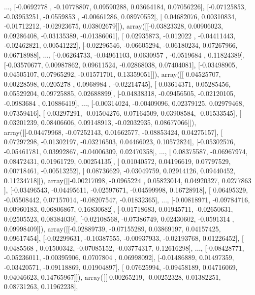 \documentclass{article}
\begin{document}
       ..., 
       [-0.0692778 , -0.10778807,  0.09590288,  0.03664184,  0.07056226],
       [-0.07125853, -0.03953251, -0.0559853 , -0.00661286,  0.08970552],
       [ 0.04682076,  0.00310834, -0.01712212, -0.02923675,  0.03802679]]), array([[-0.03823328,  0.00906023,  0.09286408, -0.03135389, -0.01386061],
       [ 0.02935873, -0.012022  , -0.04411443, -0.02462821,  0.00541222],
       [-0.02296546, -0.06605294, -0.06180234,  0.07267966,  0.06718988],
       ..., 
       [-0.06264733, -0.04961103,  0.0630957 , -0.0519684 ,  0.11824389],
       [-0.03570677,  0.00987862,  0.09611524, -0.02868038,  0.07404081],
       [-0.03498905,  0.04505107,  0.07965292, -0.01571701,  0.13359051]]), array([[ 0.04525707,  0.00228598,  0.0205278 ,  0.0968984 , -0.02214745],
       [ 0.03614371,  0.05285456,  0.05529204,  0.09725885,  0.02688899],
       [-0.04838318, -0.09456505, -0.02120105, -0.0983684 ,  0.10886419],
       ..., 
       [-0.00314024, -0.00409096,  0.02379125,  0.02979468,  0.07359416],
       [-0.03297291, -0.01504276,  0.07164509,  0.03908584, -0.01533545],
       [ 0.03201239,  0.08406606,  0.09148913, -0.02032935,  0.08677066]]), array([[-0.04479968, -0.07252143,  0.01662577, -0.08853424,  0.04275157],
       [ 0.07297298, -0.01302197, -0.03216503,  0.04466023,  0.10572824],
       [-0.05302576, -0.05461781,  0.03992867, -0.04006309,  0.02470358],
       ..., 
       [ 0.08375587, -0.06967974,  0.08472431,  0.01961729,  0.00254135],
       [ 0.01040572,  0.04196619,  0.07797529,  0.00718461, -0.00513252],
       [ 0.08736629, -0.03049759,  0.02914126,  0.09440452,  0.11234718]]), array([[-0.00217098, -0.0965224 ,  0.05823014,  0.04920327,  0.0277863 ],
       [-0.03496543, -0.04495611, -0.02597671, -0.04599998,  0.16728918],
       [ 0.06495329, -0.05508442,  0.07157014, -0.08207547, -0.01832365],
       ..., 
       [-0.00818971, -0.09784716,  0.00960183,  0.06806867,  0.16830682],
       [-0.01718683,  0.01945711, -0.02650631,  0.02505523,  0.08384039],
       [-0.02108568, -0.07386749,  0.02430602, -0.0591314 ,  0.09998409]]), array([[-0.02889739, -0.07155289,  0.03869197,  0.04157425,  0.09617454],
       [-0.02299631, -0.10387555, -0.00937933, -0.02193768,  0.01226452],
       [ 0.0485568 ,  0.01500342, -0.07085152, -0.03774317,  0.12616298],
       ..., 
       [-0.08428771, -0.05236011, -0.00395906,  0.0707804 ,  0.06998092],
       [-0.01486889,  0.01497359, -0.03420571, -0.09118869,  0.01904897],
       [ 0.07625994, -0.09458189,  0.04716069,  0.04046623,  0.14765967]]), array([[-0.00265219, -0.00252328,  0.01382251,  0.08731263,  0.11962238],
\end{document}
